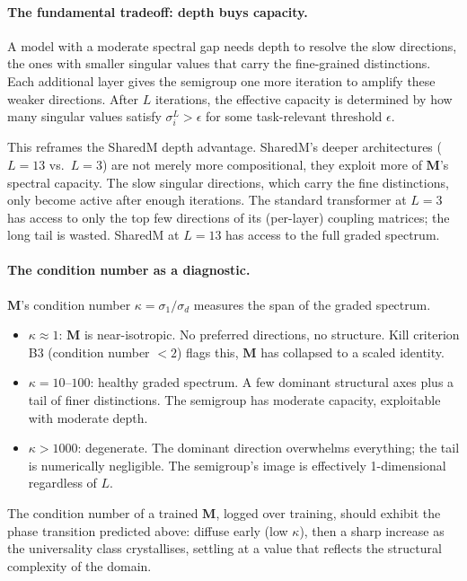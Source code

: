 \documentclass[11pt, a4paper]{article}
\newcommand{\M}{\mathbf{M}}
\theoremstyle{remark}
\begin{document}
\paragraph{The fundamental tradeoff: depth buys capacity.}
A model with a moderate spectral gap needs depth to resolve the slow directions, the ones with smaller singular values that carry the fine-grained distinctions.
Each additional layer gives the semigroup one more iteration to amplify these weaker directions.
After $L$ iterations, the effective capacity is determined by how many singular values satisfy $\sigma_i^L > \epsilon$ for some task-relevant threshold $\epsilon$.

This reframes the SharedM depth advantage.
SharedM's deeper architectures ($L = 13$ vs.\ $L = 3$) are not merely more compositional, they exploit more of $\M$'s spectral capacity.
The slow singular directions, which carry the fine distinctions, only become active after enough iterations.
The standard transformer at $L = 3$ has access to only the top few directions of its (per-layer) coupling matrices; the long tail is wasted.
SharedM at $L = 13$ has access to the full graded spectrum.

\paragraph{The condition number as a diagnostic.}
$\M$'s condition number $\kappa = \sigma_1 / \sigma_d$ measures the span of the graded spectrum.
\begin{itemize}[nosep]
    \item $\kappa \approx 1$: $\M$ is near-isotropic.
    No preferred directions, no structure.
    Kill criterion B3 (condition number $< 2$) flags this, $\M$ has collapsed to a scaled identity.
    \item $\kappa = 10$--$100$: healthy graded spectrum.
    A few dominant structural axes plus a tail of finer distinctions.
    The semigroup has moderate capacity, exploitable with moderate depth.
    \item $\kappa > 1000$: degenerate.
    The dominant direction overwhelms everything; the tail is numerically negligible.
    The semigroup's image is effectively 1-dimensional regardless of $L$.
\end{itemize}

The condition number of a trained $\M$, logged over training, should exhibit the phase transition predicted above: diffuse early (low $\kappa$), then a sharp increase as the universality class crystallises, settling at a value that reflects the structural complexity of the domain.
\end{document}
